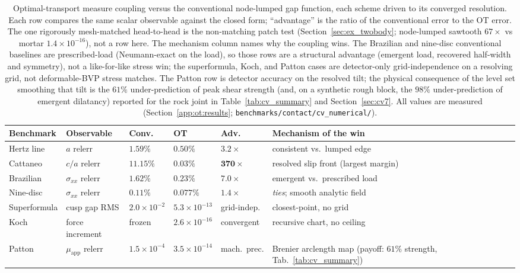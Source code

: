 \documentclass{svjour3}                 %
\newcommand{\muapp}{\mu_{\mathrm{app}}}
\newcommand{\code}[1]{\texttt{#1}}
\begin{document}
\begin{table}[t]
  \centering
  \caption{Optimal-transport measure coupling versus the conventional node-lumped gap function, each scheme
  driven to its converged resolution. Each row compares the same scalar observable against the closed form;
  ``advantage'' is the ratio of the conventional error to the OT error. The one rigorously mesh-matched head-to-head
  is the non-matching patch test (Section~\ref{sec:ex_twobody}; node-lumped sawtooth $67\times$ vs mortar
  $1.4\times10^{-16}$), not a row here. The mechanism column names why the coupling wins. The
  Brazilian and nine-disc conventional baselines are prescribed-load (Neumann-exact on the load), so those rows are
  a structural advantage (emergent load, recovered half-width and symmetry), not a like-for-like stress win; the
  superformula, Koch, and Patton cases are detector-only grid-independence on a resolving grid, not deformable-BVP
  stress matches. The Patton row is detector accuracy on the resolved tilt; the physical consequence of the level
  set smoothing that tilt is the $61\%$ under-prediction of peak shear strength (and, on a synthetic rough block,
  the $98\%$ under-prediction of emergent dilatancy) reported for the rock joint
  in Table~\ref{tab:cv_summary} and Section~\ref{sec:cv7}. All values are measured
  (Section~\ref{app:ot:results}; \code{benchmarks/contact/cv\_numerical/}).}
  \label{tab:ot_vs_conv}
  \small
  \begin{tabular}{@{}p{1.9cm}p{1.9cm}p{1.4cm}p{1.4cm}p{0.95cm}p{2.6cm}@{}}
    \toprule
    Benchmark & Observable & Conv. & OT & Adv. & Mechanism of the win \\
    \midrule
    Hertz line & $a$ relerr & $1.59\%$ & $\mathbf{0.50\%}$ & $3.2\times$ & consistent vs.\ lumped edge \\
    Cattaneo & $c/a$ relerr & $11.15\%$ & $\mathbf{0.03\%}$ & $\mathbf{370\times}$ & resolved slip front (largest margin) \\
    Brazilian & $\sigma_{xx}$ relerr & $1.62\%$ & $\mathbf{0.23\%}$ & $7.0\times$ & emergent vs.\ prescribed load \\
    Nine-disc & $\sigma_{xx}$ relerr & $0.11\%$ & $\mathbf{0.077\%}$ & $1.4\times$ & \emph{ties}; smooth analytic field \\
    Superformula & cusp gap RMS & $2.0{\times}10^{-2}$ & $5.3{\times}10^{-13}$ & grid-indep. & closest-point, no grid \\
    Koch & force increment & frozen & $2.6{\times}10^{-16}$ & convergent & recursive chart, no ceiling \\
    Patton & $\muapp$ relerr & $1.5{\times}10^{-4}$ & $3.5{\times}10^{-14}$ & mach.\ prec. & Brenier arclength map (payoff: $61\%$ strength, Tab.~\ref{tab:cv_summary}) \\
    \bottomrule
  \end{tabular}
\end{table}
\end{document}
